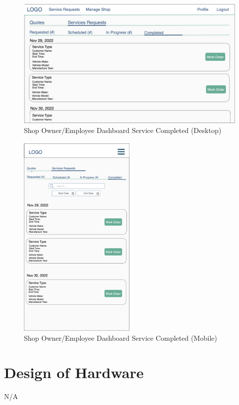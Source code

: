 \documentclass[12pt, titlepage]{article}
\begin{document}
\begin{figure}[H]
	\centering
	\includegraphics[width=\textwidth]{mockups/Shop Owner Dashboard (Service Requests - Completed) (Desktop).png}
	\caption{Shop Owner/Employee Dashboard \textemdash{} Service \textemdash{} Completed (Desktop)}
\end{figure}

\begin{figure}[H]
	\centering
	\includegraphics[width=0.5\textwidth]{mockups/Shop Owner Dashboard (Service Requests - Completed) (Mobile).png}
	\caption{Shop Owner/Employee Dashboard \textemdash{} Service \textemdash{} Completed (Mobile)}
\end{figure}

\section{Design of Hardware}
N/A
\end{document}
